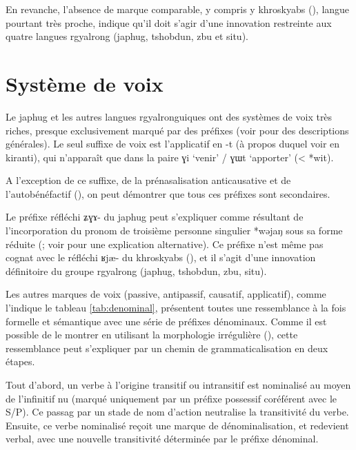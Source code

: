\documentclass[oldfontcommands,oneside,a4paper,11pt]{article}
\newcommand{\ipa}[1]{{\phon \mbox{#1}}} %
\begin{document}
En revanche, l'absence de marque comparable, y compris y khroskyabs (\citealt{lai13affixale}), langue pourtant très proche, indique qu'il doit s'agir d'une innovation restreinte aux quatre langues rgyalrong (japhug, tshobdun, zbu et situ).

\section{Système de voix}

Le japhug et les autres langues rgyalronguiques ont des systèmes de voix très riches, presque exclusivement marqué par des préfixes (voir  \citealt{lai13affixale, jacques14antipassive, jackson14morpho} pour des descriptions générales). Le seul suffixe de voix est l'applicatif en \ipa{-t} (à propos duquel voir \citealt{michailovsky85dental, jacques15derivational.khaling} en kiranti), qui n'apparaît que dans la paire \ipa{ɣi} `venir' /  \ipa{ɣɯt} `apporter' (< *\ipa{wit}).

A l'exception de ce suffixe, de la prénasalisation anticausative et de l'autobénéfactif (\citealt{jacques12demotion, jacques15spontaneous}), on peut démontrer que tous ces préfixes sont secondaires.

Le préfixe réfléchi \ipa{ʑɣɤ-} du japhug peut s'expliquer comme résultant de l'incorporation du pronom de troisième personne singulier *\ipa{wəjaŋ} sous sa forme réduite (\citealt{jacques10refl}; voir  \citealt{jackson14morpho} pour une explication alternative). Ce préfixe n'est même pas cognat avec le réfléchi \ipa{ʁjæ-} du khroskyabs  (\citealt[156-7]{lai13affixale}), et il s'agit d'une innovation définitoire du groupe rgyalrong (japhug, tshobdun, zbu, situ).

Les autres marques de voix (passive, antipassif, causatif, applicatif), comme l'indique le tableau  \ref{tab:denominal}, présentent toutes une ressemblance à la fois formelle et sémantique avec une série de préfixes dénominaux. Comme il est possible de le montrer en utilisant la morphologie irrégulière (\citealt{jacques14antipassive}), cette ressemblance peut s'expliquer par un chemin de grammaticalisation en deux étapes. 

Tout d'abord, un verbe à l'origine transitif ou intransitif est nominalisé au moyen de l'infinitif nu (marqué uniquement par un préfixe possessif coréférent avec le S/P). Ce passag par un stade de nom d'action neutralise la transitivité du verbe. Ensuite, ce verbe nominalisé reçoit une marque de dénominalisation, et redevient verbal, avec une nouvelle transitivité déterminée par le préfixe dénominal. 
\end{document}
